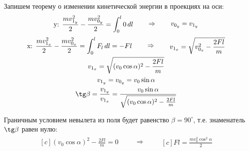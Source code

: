 \documentclass[a5paper,10pt]{article}\usepackage[usenames,dvipsnames]{color}\usepackage{cmap,graphicx,misccorr,indentfirst,makecell,multirow,ulem,geometry,amssymb,amsfonts,amsmath,amsthm,titlesec,float,fancyhdr,wrapfig,tikz}\usepackage[T2A]{fontenc}\usepackage[utf8x]{inputenc}\usepackage[english, russian]{babel}\usetikzlibrary{decorations.pathreplacing,decorations.pathmorphing,patterns,calc,scopes,arrows,through}\graphicspath{{img/}}\linespread{1.3}\frenchspacing\geometry{left=1cm, right=1cm, top=2cm, bottom=1cm, bindingoffset=0cm}\pagestyle{fancy}\fancyhead{}\fancyhead[R]{Сарафанов Ф.Г.}
\begin{document}
Запишем теорему о изменении кинетической энергии в проекциях на оси:
\begin{gather*}
    \xdef\mv{\frac{mv_{0_y}^2}{2}}\xdef\mvv{\frac{mv_{1_y}^2}{2}}\xdef\mgk{\frac{mg}{k}}%
    \begin{aligned}[c]
        \text{y: } \mvv-\mv=\int_0^l 0\,dl\\
    \end{aligned}
        \qquad\Rightarrow\qquad
    \begin{aligned}[c]
        v_{0_y}=v_{1_y}
    \end{aligned}
\end{gather*}
\begin{gather*}
    \xdef\mv{\frac{mv_{0_x}^2}{2}}\xdef\mvv{\frac{mv_{1_x}^2}{2}}\xdef\mgk{\frac{mg}{k}}%
    \begin{aligned}[c]
        \text{x: } \mvv-\mv=\int_0^l F_l\,dl=-Fl\\
    \end{aligned}
        \qquad\Rightarrow\qquad
    \begin{aligned}[c]
        v_{1_x}=\sqrt{v_{0_x}^2-\frac{2Fl}{m}}
    \end{aligned}\\
    v_{1_x}=\sqrt{(v_0\cos\alpha)^2-\frac{2Fl}{m}}\\
    v_{1_y}=v_{0_y}=v_0\sin\alpha\\
    \tg\beta=\frac{v_{1_y}}{v_{1_x}}=\frac{v_0\sin\alpha}{\sqrt{(v_0\cos\alpha)^2-\frac{2Fl}{m}}}
\end{gather*}

Граничным условием невылета из поля будет равенство $\beta=90^\circ$, т.е. знаменатель $\tg\beta$ равен нулю:
\begin{gather*}
    \begin{aligned}[c]
        (v_0\cos\alpha)^2-\frac{2Fl}{m}=0
    \end{aligned}
        \qquad\Rightarrow\qquad
    \begin{aligned}[c]
        Fl=\frac{mv_0^2\cos^2\alpha}{2}
    \end{aligned}\\
\end{gather*}
\end{document}
